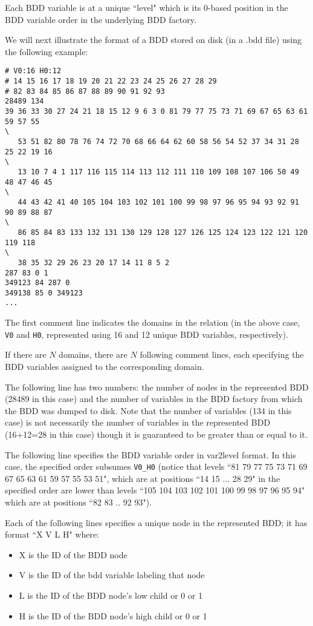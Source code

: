 Each BDD variable is at a unique ``level" which is its 0-based position in the
BDD variable order in the underlying BDD factory.

We will next illustrate the format of a BDD stored on disk (in a .bdd file)
using the following example:

\begin{framed}
\begin{verbatim}
# V0:16 H0:12
# 14 15 16 17 18 19 20 21 22 23 24 25 26 27 28 29
# 82 83 84 85 86 87 88 89 90 91 92 93
28489 134
39 36 33 30 27 24 21 18 15 12 9 6 3 0 81 79 77 75 73 71 69 67 65 63 61 59 57 55
\
   53 51 82 80 78 76 74 72 70 68 66 64 62 60 58 56 54 52 37 34 31 28 25 22 19 16
\
   13 10 7 4 1 117 116 115 114 113 112 111 110 109 108 107 106 50 49 48 47 46 45
\
   44 43 42 41 40 105 104 103 102 101 100 99 98 97 96 95 94 93 92 91 90 89 88 87
\
   86 85 84 83 133 132 131 130 129 128 127 126 125 124 123 122 121 120 119 118
\
   38 35 32 29 26 23 20 17 14 11 8 5 2
287 83 0 1
349123 84 287 0
349138 85 0 349123
...
\end{verbatim}
\end{framed}


The first comment line indicates the domains in the relation (in the above case,
{\tt V0} and {\tt H0},
represented using 16 and 12 unique BDD variables, respectively).

If there are $N$ domains, there are $N$ following comment lines, each specifying
the
BDD variables assigned to the corresponding domain.

The following line has two numbers: the number of nodes in the represented BDD
(28489 in this case) and the number of variables
in the BDD factory from which the BDD was dumped to disk.  Note that the number
of variables (134 in this case) is not
necessarily the number of variables in the represented BDD (16+12=28 in this
case) though it is guaranteed to be
greater than or equal to it.

The following line specifies the BDD variable order in var2level format.  In
this case, the specified order subsumes
{\tt V0\_H0} (notice that levels ``81 79 77 75 73 71 69 67 65 63 61 59 57 55 53
51", which are at positions ``14 15 ... 28 29"
in the specified order are lower than levels ``105 104 103 102 101 100 99 98 97
96 95 94" which are at positions
``82 83 .. 92 93").

Each of the following lines specifies a unique node in the represented BDD; it
has format ``X V L H" where:
\begin{itemize}
\item X is the ID of the BDD node
\item V is the ID of the bdd variable labeling that node
\item L is the ID of the BDD node's low child or 0 or 1
\item H is the ID of the BDD node's high child or 0 or 1
\end{itemize}

